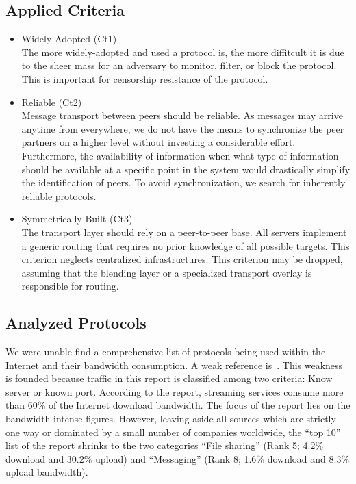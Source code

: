 \subsection{Applied Criteria\label{sec:transportCriteria}}
\begin{itemize}
	\item Widely Adopted (Ct1)\\
	The more widely-adopted and used a protocol is, the more diffitcult it is due to the sheer mass for an adversary to monitor, filter, or block the protocol. This is important for censorship resistance of the protocol. 
	\item Reliable (Ct2)\\
	Message transport between peers should be reliable. As messages may arrive anytime from everywhere, we do not have the means to synchronize the peer partners on a higher level without investing a considerable effort. Furthermore, the availability of information when what type of information should be available at a specific point in the system would drastically simplify the identification of peers. To avoid synchronization, we search for inherently reliable protocols.
	\item Symmetrically Built (Ct3)\\
	The transport layer should rely on a peer-to-peer base. All servers implement a generic routing that requires no prior knowledge of all possible targets. This criterion neglects centralized infrastructures. This criterion may be dropped, assuming that the blending layer or a specialized transport overlay is responsible for routing.
\end{itemize}

\subsection{Analyzed Protocols}
We were unable find a comprehensive list of protocols being used within the Internet and their bandwidth consumption. A weak reference is~\cite{zhou2011examining}. This weakness is founded because traffic in this report is classified among two criteria: Know server or known port. According to the report, streaming services consume more than 60\% of the Internet download bandwidth. The focus of the report lies on the bandwidth-intense figures. However, leaving aside all sources which are strictly one way or dominated by a small number of companies worldwide, the ``top 10'' list of the report shrinks to the two categories ``File sharing'' (Rank 5; 4.2\% download and 30.2\% upload) and ``Messaging'' (Rank 8; 1.6\% download and 8.3\% upload bandwidth). 

